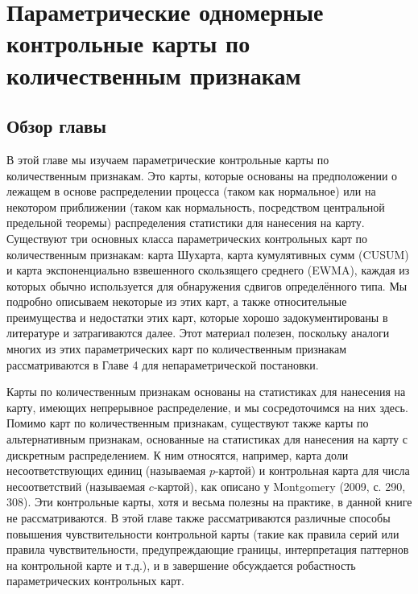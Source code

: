 \chapter{Параметрические одномерные контрольные карты по количественным признакам}

\section*{Обзор главы}
В этой главе мы изучаем параметрические контрольные карты по количественным признакам. Это карты, которые основаны на предположении о лежащем в основе распределении процесса (таком как нормальное) или на некотором приближении (таком как нормальность, посредством центральной предельной теоремы) распределения статистики для нанесения на карту. Существуют три основных класса параметрических контрольных карт по количественным признакам: карта Шухарта, карта кумулятивных сумм (CUSUM) и карта экспоненциально взвешенного скользящего среднего (EWMA), каждая из которых обычно используется для обнаружения сдвигов определённого типа. Мы подробно описываем некоторые из этих карт, а также относительные преимущества и недостатки этих карт, которые хорошо задокументированы в литературе и затрагиваются далее. Этот материал полезен, поскольку аналоги многих из этих параметрических карт по количественным признакам рассматриваются в Главе 4 для непараметрической постановки.

Карты по количественным признакам основаны на статистиках для нанесения на карту, имеющих непрерывное распределение, и мы сосредоточимся на них здесь. Помимо карт по количественным признакам, существуют также карты по альтернативным признакам, основанные на статистиках для нанесения на карту с дискретным распределением. К ним относятся, например, карта доли несоответствующих единиц (называемая \(p\)-картой) и контрольная карта для числа несоответствий (называемая \(c\)-картой), как описано у Montgomery (2009, с. 290, 308). Эти контрольные карты, хотя и весьма полезны на практике, в данной книге не рассматриваются. В этой главе также рассматриваются различные способы повышения чувствительности контрольной карты (такие как правила серий или правила чувствительности, предупреждающие границы, интерпретация паттернов на контрольной карте и т.д.), и в завершение обсуждается робастность параметрических контрольных карт.

